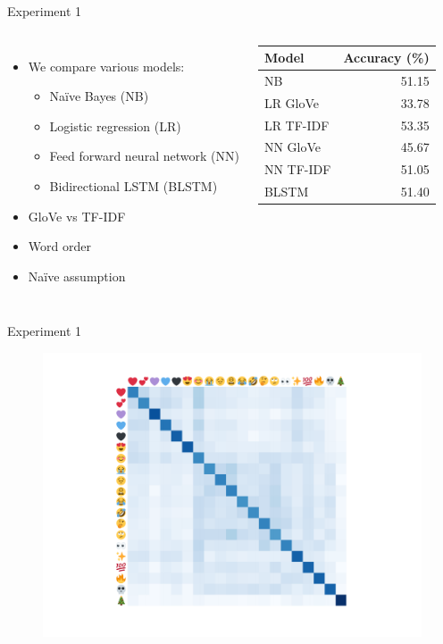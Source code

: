 \documentclass{beamer}
\begin{document}
\begin{frame}{Experiment 1}
	\begin{columns}
		\begin{itemize}
			\item We compare various models:
			\begin{itemize}
				\item Na\"ive Bayes (NB)
				\item Logistic regression (LR)
				\item Feed forward neural network (NN)
				\item Bidirectional LSTM (BLSTM)
			\end{itemize}
			\item GloVe vs TF-IDF
			\item Word order
			\item Na\"ive assumption
		\end{itemize}
		\begin{table}
			\begin{center}
				\begin{tabular}{lr}
					\toprule
					Model & Accuracy (\%) \\
					\midrule
					NB        & 51.15 \\
					LR GloVe  & 33.78 \\
					LR TF-IDF & 53.35 \\
					NN GloVe  & 45.67 \\
					NN TF-IDF & 51.05 \\
					BLSTM     & 51.40 \\
					\bottomrule
				\end{tabular}
			\end{center}
		\end{table}
	\end{columns}	
\end{frame}

\begin{frame}{Experiment 1}
	\begin{figure}
		\begin{center}
			\includegraphics[width=0.6\columnwidth]{img/confusion_matrix.pdf}
		\end{center}
	\end{figure}
\end{frame}
\end{document}
